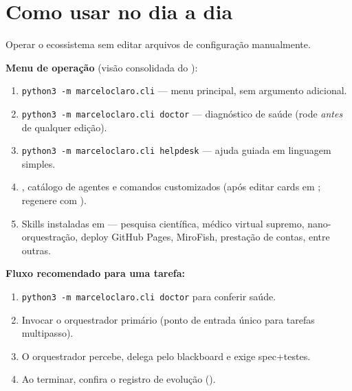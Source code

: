 \clearpage
\section{Como usar no dia a dia}


\begin{funcao}
Operar o ecossistema sem editar arquivos de configuração manualmente.
\end{funcao}

\begin{processo}
\textbf{Menu de operação} (visão consolidada do ):
\begin{enumerate}[leftmargin=1.4em,itemsep=1pt]
  \item \texttt{python3\ -m\ marceloclaro.cli} — menu principal, sem argumento adicional.
  \item \texttt{python3\ -m\ marceloclaro.cli\ doctor} — diagnóstico de saúde (rode
        \emph{antes} de qualquer edição).
  \item \texttt{python3\ -m\ marceloclaro.cli\ helpdesk} — ajuda guiada em linguagem
        simples.
  \item {},
        catálogo de agentes e comandos customizados (após editar cards em
         ; regenere com ).
  \item Skills instaladas em  — pesquisa científica,
        médico virtual supremo, nano-orquestração, deploy GitHub Pages, MiroFish,
        prestação de contas, entre outras.
\end{enumerate}
\end{processo}

\begin{metodo}
\textbf{Fluxo recomendado para uma tarefa:}
\begin{enumerate}[leftmargin=1.4em,itemsep=1pt]
  \item \texttt{python3\ -m\ marceloclaro.cli\ doctor} para conferir saúde.
  \item Invocar o orquestrador primário  (ponto de entrada único
        para tarefas multipasso).
  \item O orquestrador percebe, delega pelo blackboard e exige spec+testes.
  \item Ao terminar, confira o registro de evolução ().
\end{enumerate}
\end{metodo}

